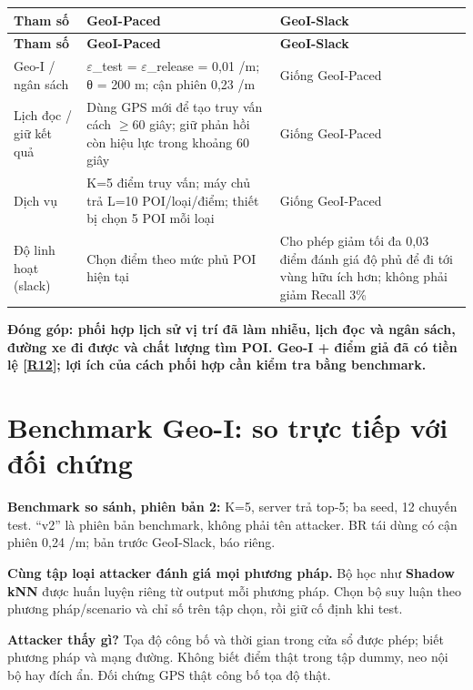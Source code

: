 \documentclass[10pt,a4paper]{article}
\newcommand{\key}[1]{\par\smallskip\noindent\colorbox{pale}{\parbox{\dimexpr\linewidth-2\fboxsep}{\textbf{#1}}}\par\smallskip}
\begin{document}
\begingroup\small
\begin{longtable}{@{}P{3.938cm}P{6.350cm}P{6.350cm}@{}}
\toprule
\textbf{Tham số} & \textbf{GeoI-Paced} & \textbf{GeoI-Slack}\\\midrule
\endfirsthead
\toprule
\textbf{Tham số} & \textbf{GeoI-Paced} & \textbf{GeoI-Slack}\\\midrule
\endhead
\bottomrule\endfoot
Geo-I / ngân sách & $\varepsilon$\_\allowbreak{}test = $\varepsilon$\_\allowbreak{}release = 0,01 /m; θ = 200 m; cận phiên 0,23 /m & Giống GeoI-Paced\\
\addlinespace[3pt]
Lịch đọc / giữ kết quả & Dùng GPS mới để tạo truy vấn cách $\ge$60 giây; giữ phản hồi còn hiệu lực trong khoảng 60 giây & Giống GeoI-Paced\\
\addlinespace[3pt]
Dịch vụ & K=5 điểm truy vấn; máy chủ trả L=10 POI/loại/điểm; thiết bị chọn 5 POI mỗi loại & Giống GeoI-Paced\\
\addlinespace[3pt]
Độ linh hoạt (slack) & Chọn điểm theo mức phủ POI hiện tại & Cho phép giảm tối đa 0,03 điểm đánh giá độ phủ để đi tới vùng hữu ích hơn; không phải giảm Recall 3\%\\
\end{longtable}
\endgroup
\key{Đóng góp: phối hợp lịch sử vị trí đã làm nhiễu, lịch đọc và ngân sách, đường xe đi được và chất lượng tìm POI. Geo-I + điểm giả đã có tiền lệ [\hyperlink{ref-R12}{R12}]; lợi ích của cách phối hợp cần kiểm tra bằng benchmark.}


\clearpage
\section{Benchmark Geo-I: so trực tiếp với đối chứng}\label{sec:3}
\textbf{Benchmark so sánh, phiên bản 2:} K=5, server trả top-5; ba seed, 12 chuyến test. “v2” là phiên bản benchmark, không phải tên attacker. BR tái dùng có cận phiên 0,24 /m; bản trước GeoI-Slack, báo riêng.

\textbf{Cùng tập loại attacker đánh giá mọi phương pháp.} Bộ học như \textbf{Shadow kNN} được huấn luyện riêng từ output mỗi phương pháp. Chọn bộ suy luận theo phương pháp/scenario và chỉ số trên tập chọn, rồi giữ cố định khi test.

\textbf{Attacker thấy gì?} Tọa độ công bố và thời gian trong cửa sổ được phép; biết phương pháp và mạng đường. Không biết điểm thật trong tập dummy, neo nội bộ hay đích ẩn. Đối chứng GPS thật công bố tọa độ thật.
\end{document}
